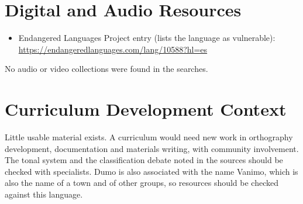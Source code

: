 \documentclass[12pt]{article}
\begin{document}
\section{Digital and Audio Resources}
\begin{itemize}
\item Endangered Languages Project entry (lists the language as vulnerable): \url{https://endangeredlanguages.com/lang/10588?hl=es}
\end{itemize}
No audio or video collections were found in the searches.

\section{Curriculum Development Context}
Little usable material exists. A curriculum would need new work in orthography development, documentation and materials writing, with community involvement. The tonal system and the classification debate noted in the sources should be checked with specialists. Dumo is also associated with the name Vanimo, which is also the name of a town and of other groups, so resources should be checked against this language.
\end{document}
